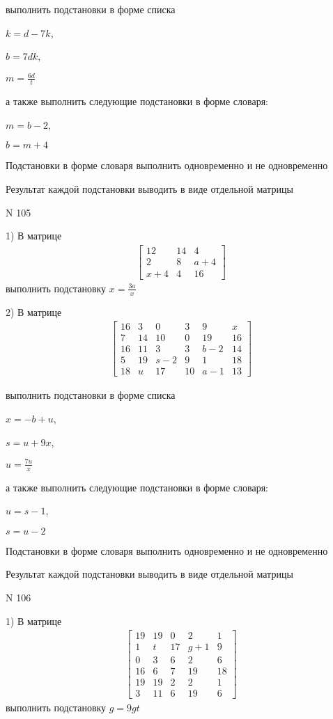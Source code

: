\documentclass[11pt]{report}
\begin{document}
выполнить подстановки в форме списка

$k=d - 7 k$,

$b=7 d k$,

$m=\frac{6 d}{t}$

а также выполнить следующие подстановки в форме словаря:

$m=b - 2$,

$b=m + 4$


    Подстановки в форме словаря выполнить одновременно и не одновременно


    Результат каждой подстановки выводить в виде отдельной матрицы

\newpage
N 105


    1) В матрице
\begin{align*}
\left[\begin{matrix}12 & 14 & 4\\2 & 8 & a + 4\\x + 4 & 4 & 16\end{matrix}\right]
\end{align*}
выполнить подстановку $x=\frac{3 a}{x}$


    2) В матрице
\begin{align*}
\left[\begin{matrix}16 & 3 & 0 & 3 & 9 & x\\7 & 14 & 10 & 0 & 19 & 16\\16 & 11 & 3 & 3 & b - 2 & 14\\5 & 19 & s - 2 & 9 & 1 & 18\\18 & u & 17 & 10 & a - 1 & 13\end{matrix}\right]
\end{align*}

выполнить подстановки в форме списка

$x=- b + u$,

$s=u + 9 x$,

$u=\frac{7 u}{x}$

а также выполнить следующие подстановки в форме словаря:

$u=s - 1$,

$s=u - 2$


    Подстановки в форме словаря выполнить одновременно и не одновременно


    Результат каждой подстановки выводить в виде отдельной матрицы

\newpage
N 106


    1) В матрице
\begin{align*}
\left[\begin{matrix}19 & 19 & 0 & 2 & 1\\1 & t & 17 & g + 1 & 9\\0 & 3 & 6 & 2 & 6\\16 & 6 & 7 & 19 & 18\\19 & 19 & 2 & 2 & 1\\3 & 11 & 6 & 19 & 6\end{matrix}\right]
\end{align*}
выполнить подстановку $g=9 g t$
\end{document}
